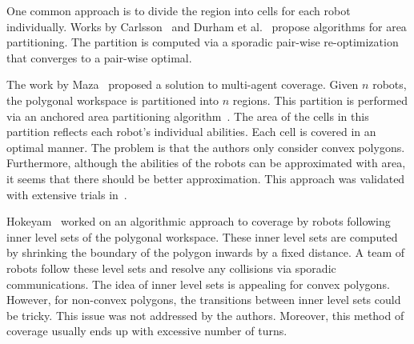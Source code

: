 \documentclass[../main.tex]{subfiles}
\begin{document}
One common approach is to divide the region into cells for each robot individually. Works by Carlsson~\cite{carlsson2012dividing} and Durham et al.~\cite{durham2012discrete} propose algorithms for area partitioning. The partition is computed via a sporadic pair-wise re-optimization that converges to a pair-wise optimal.

The work by Maza~\cite{maza2007multiple} proposed a solution to multi-agent coverage. Given $n$ robots, the polygonal workspace is partitioned into $n$ regions. This partition is performed via an anchored area partitioning algorithm~\cite{hert1998polygon}. The area of the cells in this partition reflects each robot's individual abilities. Each cell is covered in an optimal manner. The problem is that the authors only consider convex polygons. Furthermore, although the abilities of the robots can be approximated with area, it seems that there should be better approximation. This approach was validated with extensive trials in~\cite{barrientos2011aerial}.


Hokeyam~\cite{hokayem2007dynamic} worked on an algorithmic approach to coverage by robots following inner level sets of the polygonal workspace. These inner level sets are computed by shrinking the boundary of the polygon inwards by a fixed distance. A team of robots follow these level sets and resolve any collisions via sporadic communications. The idea of inner level sets is appealing for convex polygons. However, for non-convex polygons, the transitions between inner level sets could be tricky. This issue was not addressed by the authors. Moreover, this method of coverage usually ends up with excessive number of turns.

\end{document}

